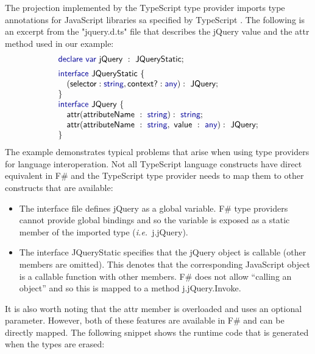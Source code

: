 \documentclass[submission,copyright,creativecommons]{eptcs}
\newcommand{\kvd}[1]{\textnormal{\textcolor{kvdclr}{\sffamily #1}}}
\newcommand{\str}[1]{\textnormal{\textcolor{strclr}{\ttfamily "#1"}}}
\newcommand{\ident}[1]{\textnormal{\sffamily #1}}
\begin{document}
The projection implemented by the TypeScript type provider imports type annotations for JavaScript
libraries sa specified by TypeScript \cite{ms-typescript}. The following is an excerpt from the
\str{jquery.d.ts} file that describes the \ident{jQuery} value and the \ident{attr} method used
in our example:
%
\begin{equation*}
\begin{array}{l}
 \kvd{declare var}~\ident{jQuery}~:~\ident{JQueryStatic};
\\[0.5em]
 \kvd{interface}~\ident{JQueryStatic}~\{ \\
 \quad (\ident{selector}: \kvd{string}, \ident{context?}: \kvd{any}):~\ident{JQuery}; \\
\}
\\
\kvd{interface}~\ident{JQuery}~\{ \\
\quad \ident{attr}(\ident{attributeName}~:~\kvd{string}):~\kvd{string}; \\
\quad \ident{attr}(\ident{attributeName}~:~\kvd{string},~\ident{value}~:~\kvd{any}):~\ident{JQuery}; \\
\}
\end{array}
\end{equation*}
%
The example demonstrates typical problems that arise when using type providers for language
interoperation. Not all TypeScript language constructs have direct equivalent in F\# and
the TypeScript type provider needs to map them to other constructs that are available:
%
\begin{itemize}
\item The interface file defines \ident{jQuery} as a global variable. F\# type providers cannot
  provide global bindings and so the variable is exposed as a static member of the imported type
  (\emph{i.e.}~\ident{j.jQuery}).

\item The interface \ident{JQueryStatic} specifies that the \ident{jQuery} object is callable
  (other members are omitted). This denotes that the corresponding JavaScript object is a
  callable function with other members. F\# does not allow ``calling an object'' and so
  this is mapped to a method \ident{j.jQuery.Invoke}.
\end{itemize}

\noindent
It is also worth noting that the \ident{attr} member is overloaded and uses an optional parameter.
However, both of these features are available in F\# and can be directly mapped. The following
snippet shows the runtime code that is generated when the types are erased:
\end{document}
